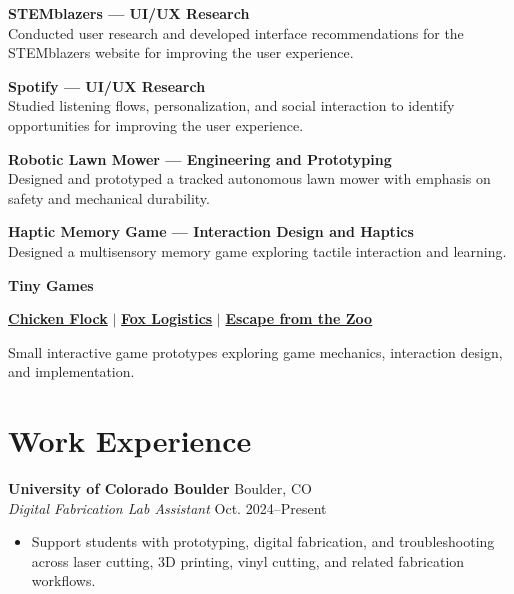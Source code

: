 \documentclass[10pt,letterpaper]{article}
\newcommand{\cvitem}[4]{%
  {\bfseries\color{darkteal}#1}
  \hfill
  {\small\color{muted}#2}\\
  {\textit{#3}}
  \hfill
  {\small\color{muted}#4}%
  \vspace{4pt}%
}
\newcommand{\project}[2]{%
  {\bfseries\color{darkteal}#1}\\[1pt]
  {\color{muted}#2}%
  \vspace{7pt}%
}
\begin{document}
\project
{STEMblazers --- UI/UX Research}
{Conducted user research and developed interface recommendations
for the STEMblazers website for improving the user experience.}

\project
{Spotify --- UI/UX Research}
{Studied listening flows, personalization, and social interaction
to identify opportunities for improving the user experience.}

\project
{Robotic Lawn Mower --- Engineering and Prototyping}
{Designed and prototyped a tracked autonomous lawn mower with emphasis
on safety and mechanical durability.}

\project
{Haptic Memory Game --- Interaction Design and Haptics}
{Designed a multisensory memory game exploring tactile interaction
and learning.}

{\bfseries\color{darkteal}Tiny Games}

\vspace{2pt}

\href{https://saharnaz.itch.io/chicken-flock}
{\textbf{Chicken Flock}}
\quad $\vert$ \quad
\href{https://saharnaz.itch.io/fox-logistics}
{\textbf{Fox Logistics}}
\quad $\vert$ \quad
\href{https://saharnaz.itch.io/escape-from-the-zoo}
{\textbf{Escape from the Zoo}}

\vspace{2pt}

{\color{muted}
Small interactive game prototypes exploring game mechanics,
interaction design, and implementation.
}




\section{Work Experience}

\cvitem
{University of Colorado Boulder}
{Boulder, CO}
{Digital Fabrication Lab Assistant}
{Oct. 2024--Present}

\begin{itemize}
  \item Support students with prototyping, digital fabrication,
  and troubleshooting across laser cutting, 3D printing,
  vinyl cutting, and related fabrication workflows.
\end{itemize}

\vspace{4pt}
\end{document}
